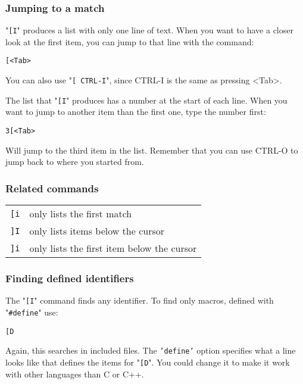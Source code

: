 \subsubsection{Jumping to a match}
"\texttt{[I}" produces a list with only one line of text.
When you want to have a closer look at the first item, you can jump to that line with the command:

\begin{Verbatim}[samepage=true]
 [<Tab>
\end{Verbatim}

You can also use "\texttt{[ CTRL-I}", since CTRL-I is the same as pressing <Tab>.

The list that "\texttt{[I}" produces has a number at the start of each line.
When you want to jump to another item than the first one, type the number first:

\begin{Verbatim}[samepage=true]
 3[<Tab>
\end{Verbatim}

Will jump to the third item in the list.
Remember that you can use CTRL-O to jump back to where you started from.
\subsubsection{Related commands}

\begin{center} \begin{tabular}{c l}
\texttt{[i} & only lists the first match \\
\texttt{]I} & only lists items below the cursor \\
\texttt{]i} & only lists the first item below the cursor \\
\end{tabular} \end{center}

\subsubsection{Finding defined identifiers}
The "\texttt{[I}" command finds any identifier.
To find only macros, defined with "\texttt{\#define}" use:

\begin{Verbatim}[samepage=true]
 [D
\end{Verbatim}

Again, this searches in included files.
The \texttt{'define'} option specifies what a line looks like that defines the items for "\texttt{[D}".
You could change it to make it work with other languages than C or C++.

